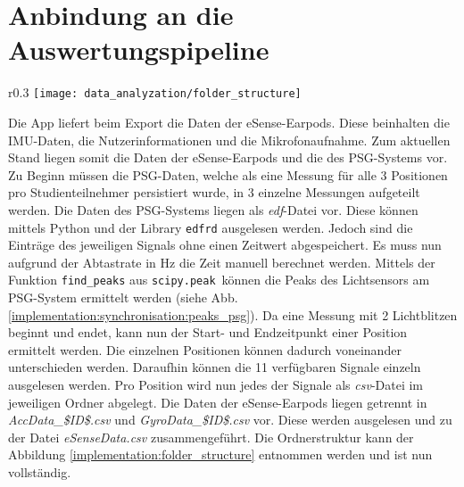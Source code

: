 \newpage
\section{Anbindung an die Auswertungspipeline}
\label{ch:Implementierung:way_to_pipeline}
\begin{wrapfigure}{r}{0.3\textwidth}
  \centering
  \texttt{[image: data\_analyzation/folder\_structure]}
  \caption{Ornderstruktur des Datensatzes}
  \label{implementation:folder_structure}
\end{wrapfigure}
Die App liefert beim Export die Daten der eSense-Earpods.
Diese beinhalten die IMU-Daten, die Nutzerinformationen und die Mikrofonaufnahme.
Zum aktuellen Stand liegen somit die Daten der eSense-Earpods und die des PSG-Systems vor. 
Zu Beginn müssen die PSG-Daten, welche als eine Messung für alle 3 Positionen pro Studienteilnehmer persistiert wurde, in 3 einzelne Messungen aufgeteilt werden.
Die Daten des PSG-Systems liegen als \textit{edf}-Datei vor. 
Diese können mittels Python und der Library \texttt{edfrd} ausgelesen werden.
Jedoch sind die Einträge des jeweiligen Signals ohne einen Zeitwert abgespeichert. 
Es muss nun aufgrund der Abtastrate in $\si{\hertz}$ die Zeit manuell berechnet werden. 
Mittels der Funktion \texttt{find\_peaks} aus \texttt{scipy.peak}\ können die Peaks des Lichtsensors am PSG-System ermittelt werden (siehe Abb. \ref{implementation:synchronisation:peaks_psg}).
Da eine Messung mit 2 Lichtblitzen beginnt und endet, kann nun der Start- und Endzeitpunkt einer Position ermittelt werden. 
Die einzelnen Positionen können dadurch voneinander unterschieden werden. 
Daraufhin können die 11 verfügbaren Signale einzeln ausgelesen werden.
Pro Position wird nun jedes der Signale als \textit{csv}-Datei im jeweiligen Ordner abgelegt.
Die Daten der eSense-Earpods liegen getrennt in \textit{AccData\_\$ID\$.csv} und \textit{GyroData\_\$ID\$.csv} vor. 
Diese werden ausgelesen und zu der Datei \textit{eSenseData.csv} zusammengeführt.
Die Ordnerstruktur kann der Abbildung \ref{implementation:folder_structure} entnommen werden und ist nun vollständig.

